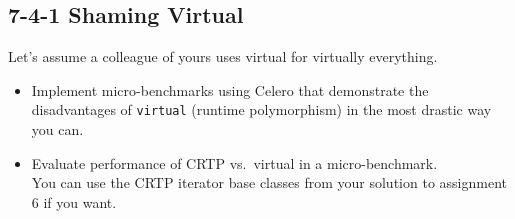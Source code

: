 \documentclass[]{article}
\begin{document}
\subsection{7-4-1 Shaming Virtual}\label{shaming-virtual}

Let's assume a colleague of yours uses virtual for virtually everything.

\begin{itemize}
\item
  Implement micro-benchmarks using Celero that demonstrate the
  disadvantages of \texttt{virtual} (runtime polymorphism) in the most
  drastic way you can.
\item
  Evaluate performance of CRTP vs.~virtual in a micro-benchmark.\\
   You can use the CRTP iterator base classes from your solution to
  assignment 6 if you want.
\end{itemize}
\end{document}
